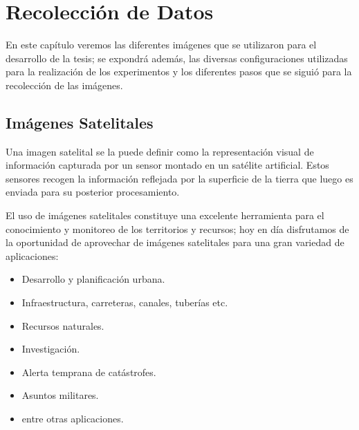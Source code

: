 \chapter{Recolección de Datos}\label{chap:recoleccion}

En este capítulo veremos las diferentes imágenes que se utilizaron para el desarrollo de la tesis; se expondrá además, las diversas configuraciones utilizadas para la realización de los experimentos y los diferentes pasos que se siguió para la recolección de las imágenes.


\section{Imágenes Satelitales}\label{sec:imagen_satelitales}

Una imagen satelital se la puede definir como la representación visual de información capturada por un sensor montado en un satélite artificial. Estos sensores recogen la información reflejada por la superficie de la tierra que luego es enviada para su posterior procesamiento.

El uso de imágenes satelitales constituye una excelente herramienta para el conocimiento y monitoreo de los territorios y recursos; hoy en día disfrutamos de la oportunidad de aprovechar de imágenes satelitales para una gran variedad de aplicaciones:
\begin{itemize}
	\item Desarrollo y planificación urbana.
	\item Infraestructura, carreteras, canales, tuberías etc.
	\item Recursos naturales.
	\item Investigación.
	\item Alerta temprana de catástrofes.
	\item Asuntos militares.
	\item entre otras aplicaciones.
\end{itemize}

